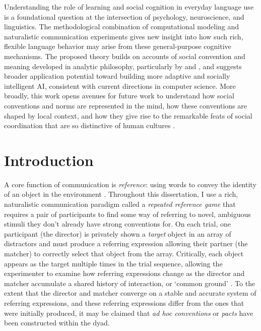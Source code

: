 \documentclass[11pt]{article}
\begin{document}
Understanding the role of learning and social cognition in everyday language use is a foundational question at the intersection of psychology, neuroscience, and linguistics. 
The methodological combination of computational modeling and naturalistic communication experiments gives new insight into how such rich, flexible language behavior may arise from these general-purpose cognitive mechanisms.
The proposed theory builds on accounts of social convention and meaning developed in analytic philosophy, particularly by  and , and suggests broader application potential toward building more adaptive and socially intelligent AI, consistent with current directions in computer science. 
More broadly, this work opens avenues for future work to understand how social conventions and norms are represented in the mind, how these conventions are shaped by local context, and how they give rise to the remarkable feats of social coordination that are so distinctive of human cultures \cite{hawkins2019emergence}.

\section*{Introduction}

A core function of communication is \emph{reference}: using words to convey the identity of an object in the environment \cite{Brown58_HowShallAThingBeCalled,Searle69_SpeechActs,van_deemter_computational_2016}.
Throughout this dissertation, I use a rich, naturalistic communication paradigm called a \emph{repeated reference game} \cite{KraussWeinheimer64_ReferencePhrases} that requires a pair of participants to find some way of referring to novel, ambiguous stimuli they don't already have strong conventions for.
On each trial, one participant (the director) is privately shown a \emph{target} object in an array of distractors and must produce a referring expression allowing their partner (the matcher) to correctly select that object from the array. 
Critically, each object appears as the target multiple times in the trial sequence, allowing the experimenter to examine how referring expressions change as the director and matcher accumulate a shared history of interaction, or `common ground' \cite{clark_using_1996}.
To the extent that the director and matcher converge on a stable and accurate system of referring expressions, and these referring expressions differ from the ones that were initially produced, it may be claimed that \emph{ad hoc conventions} or \emph{pacts} have been constructed within the dyad.
\end{document}

